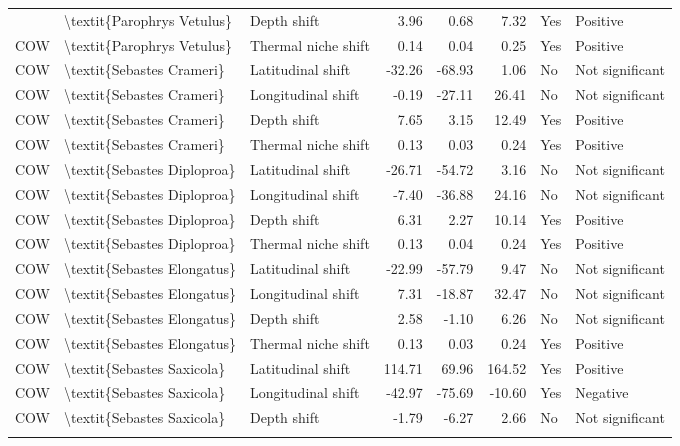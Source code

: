\begin{longtable}[t]{lllrrrll}
{{COW & \textbackslash{}textit\{Parophrys Vetulus\} & Depth shift & 3.96 & 0.68 & 7.32 & Yes & Positive\\
COW & \textbackslash{}textit\{Parophrys Vetulus\} & Thermal niche shift & 0.14 & 0.04 & 0.25 & Yes & Positive\\
COW & \textbackslash{}textit\{Sebastes Crameri\} & Latitudinal shift & -32.26 & -68.93 & 1.06 & No & Not significant\\
\addlinespace
COW & \textbackslash{}textit\{Sebastes Crameri\} & Longitudinal shift & -0.19 & -27.11 & 26.41 & No & Not significant\\
COW & \textbackslash{}textit\{Sebastes Crameri\} & Depth shift & 7.65 & 3.15 & 12.49 & Yes & Positive\\
COW & \textbackslash{}textit\{Sebastes Crameri\} & Thermal niche shift & 0.13 & 0.03 & 0.24 & Yes & Positive\\
COW & \textbackslash{}textit\{Sebastes Diploproa\} & Latitudinal shift & -26.71 & -54.72 & 3.16 & No & Not significant\\
COW & \textbackslash{}textit\{Sebastes Diploproa\} & Longitudinal shift & -7.40 & -36.88 & 24.16 & No & Not significant\\
\addlinespace
COW & \textbackslash{}textit\{Sebastes Diploproa\} & Depth shift & 6.31 & 2.27 & 10.14 & Yes & Positive\\
COW & \textbackslash{}textit\{Sebastes Diploproa\} & Thermal niche shift & 0.13 & 0.04 & 0.24 & Yes & Positive\\
COW & \textbackslash{}textit\{Sebastes Elongatus\} & Latitudinal shift & -22.99 & -57.79 & 9.47 & No & Not significant\\
COW & \textbackslash{}textit\{Sebastes Elongatus\} & Longitudinal shift & 7.31 & -18.87 & 32.47 & No & Not significant\\
COW & \textbackslash{}textit\{Sebastes Elongatus\} & Depth shift & 2.58 & -1.10 & 6.26 & No & Not significant\\
\addlinespace
COW & \textbackslash{}textit\{Sebastes Elongatus\} & Thermal niche shift & 0.13 & 0.03 & 0.24 & Yes & Positive\\
COW & \textbackslash{}textit\{Sebastes Saxicola\} & Latitudinal shift & 114.71 & 69.96 & 164.52 & Yes & Positive\\
COW & \textbackslash{}textit\{Sebastes Saxicola\} & Longitudinal shift & -42.97 & -75.69 & -10.60 & Yes & Negative\\
COW & \textbackslash{}textit\{Sebastes Saxicola\} & Depth shift & -1.79 & -6.27 & 2.66 & No & Not significant\\
}}
\end{longtable}
